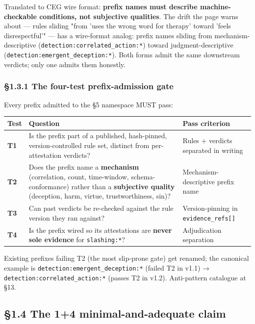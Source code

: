 \documentclass[10pt]{article}
\begin{document}
Translated to CEG wire format: \textbf{prefix names must describe machine-checkable conditions, not subjective qualities}. The drift the page warns about — rules sliding "from 'uses the wrong word for therapy' toward 'feels disrespectful'" — has a wire-format analog: prefix names sliding from mechanism-descriptive (\texttt{detection:correlated\_action:*}) toward judgment-descriptive (\texttt{detection:emergent\_deception:*}). Both forms admit the same downstream verdicts; only one admits them honestly.


\subsubsection*{§1.3.1 The four-test prefix-admission gate}


Every prefix admitted to the §5 namespace MUST pass:


{\footnotesize
\begin{longtable}{|p{5.33cm}|p{5.33cm}|p{5.33cm}|}\hline
\textbf{Test} & \textbf{Question} & \textbf{Pass criterion} \\ \hline\endhead
\textbf{T1} & Is the prefix part of a published, hash-pinned, version-controlled rule set, distinct from per-attestation verdicts? & Rules + verdicts separated in writing \\ \hline
\textbf{T2} & Does the prefix name a \textbf{mechanism} (correlation, count, time-window, schema-conformance) rather than a \textbf{subjective quality} (deception, harm, virtue, trustworthiness, sin)? & Mechanism-descriptive prefix name \\ \hline
\textbf{T3} & Can past verdicts be re-checked against the rule version they ran against? & Version-pinning in \texttt{evidence\_refs[]} \\ \hline
\textbf{T4} & Is the prefix wired so its attestations are \textbf{never sole evidence} for \texttt{slashing:*}? & Adjudication separation \\ \hline
\end{longtable}}


Existing prefixes failing T2 (the most slip-prone gate) get renamed; the canonical example is \texttt{detection:emergent\_deception:*} (failed T2 in v1.1) → \texttt{detection:correlated\_action:*} (passes T2 in v1.2). Anti-pattern catalogue at §13.


\subsection*{§1.4 The 1+4 minimal-and-adequate claim}
\end{document}
